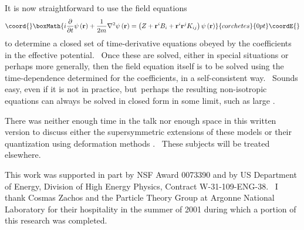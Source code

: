 \documentclass[a4paper,12pt]{article}%
\begin{document}
It is now straightforward to use the field equations
\[\coord{}\boxMath{
i\frac{\partial}{\partial t}\psi\left(  \mathbf{r}\right)  +\frac{1}{2m}%
\nabla^{2}\psi\left(  \mathbf{r}\right)  =\left(  Z+\mathbf{r}^{i}%
B_{i}+\mathbf{r}^{i}\mathbf{r}^{j}K_{ij}\right)  \psi\left(  \mathbf{r}%
\right)
}{corchetes}{0pt}\coordE{}\]
to determine a closed set of time-derivative equations obeyed by the
coefficients in the effective potential. \ Once these are solved, either in
special situations or perhaps more generally, then the field equation itself
is to be solved using the time-dependence determined for the coefficients, in
a self-consistent way. \ Sounds easy, even if it is not in practice,
but\ perhaps the resulting non-isotropic equations can always be solved in
closed form in some limit, such as large \coordHE{}.

There was neither enough time in the talk nor enough space in this written
version to discuss either the supersymmetric extensions of these models or
their quantization using deformation methods \cite{CPZ,TLCunpub}. \ These
subjects will be treated elsewhere.\bigskip

\newline This work was supported in part by
NSF Award 0073390 and by US Department of Energy, Division of High Energy
Physics, Contract W-31-109-ENG-38. \ I thank Cosmas Zachos and the Particle
Theory Group at Argonne National Laboratory for their hospitality in the
summer of 2001 during which a portion of this research was completed.
\end{document}
